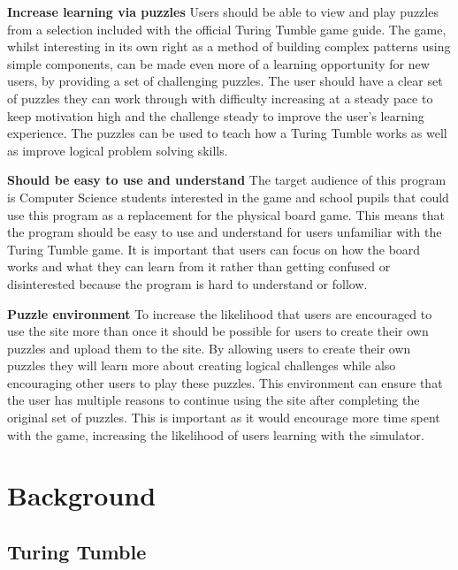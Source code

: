 \documentclass{l4proj}
\begin{document}
\textbf{Increase learning via puzzles} Users should be able to view and play puzzles from a selection included with the official Turing Tumble game guide. The game, whilst interesting in its own right as a method of building complex patterns using simple components, can be made even more of a learning opportunity for new users, by providing a set of challenging puzzles. The user should have a clear set of puzzles they can work through with difficulty increasing at a steady pace to keep motivation high and the challenge steady to improve the user's learning experience. The puzzles can be used to teach how a Turing Tumble works as well as improve logical problem solving skills.    

\textbf{Should be easy to use and understand} The target audience of this program is Computer Science students interested in the game and school pupils that could use this program as a replacement for the physical board game. This means that the program should be easy to use and understand for users unfamiliar with the Turing Tumble game. It is important that users can focus on how the board works and what they can learn from it rather than getting confused or disinterested because the program is hard to understand or follow. 

\textbf{Puzzle environment} To increase the likelihood that users are encouraged to use the site more than once it should be possible for users to create their own puzzles and upload them to the site. By allowing users to create their own puzzles they will learn more about creating logical challenges while also encouraging other users to play these puzzles. This environment can ensure that the user has multiple reasons to continue using the site after completing the original set of puzzles. This is important as it would encourage more time spent with the game, increasing the likelihood of users learning with the simulator. 

\chapter{Background}
\section{Turing Tumble}
\label{section:background}
\end{document}
